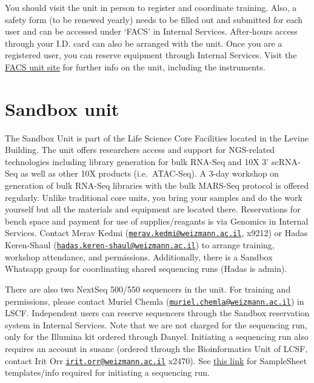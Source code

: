 \documentclass[
]{book}
\begin{document}
You should visit the unit in person to register and coordinate training. Also, a safety form (to be renewed yearly) needs to be filled out and submitted for each user and can be accessed under `FACS' in Internal Services. After-hours access through your I.D. card can also be arranged with the unit. Once you are a registered user, you can reserve equipment through Internal Services. Visit the \href{https://www.weizmann.ac.il/LS_CoreFacilities/flow-cytometry/about}{FACS unit site} for further info on the unit, including the instruments.

\hypertarget{sandbox-unit}{%
\section{Sandbox unit}\label{sandbox-unit}}

The Sandbox Unit is part of the Life Science Core Facilities located in the Levine Building. The unit offers researchers access and support for NGS-related technologies including library generation for bulk RNA-Seq and 10X 3' scRNA-Seq as well as other 10X products (i.e.~ATAC-Seq). A 3-day workshop on generation of bulk RNA-Seq libraries with the bulk MARS-Seq protocol is offered regularly. Unlike traditional core units, you bring your samples and do the work yourself but all the materials and equipment are located there. Reservations for bench space and payment for use of supplies/reagants is via Genomics in Internal Services. Contact Merav Kedmi (\href{mailto:merav.kedmi@weizmann.ac.il}{\nolinkurl{merav.kedmi@weizmann.ac.il}}, x9212) or Hadas Keren-Shaul (\href{mailto:hadas.keren-shaul@weizmann.ac.il}{\nolinkurl{hadas.keren-shaul@weizmann.ac.il}}) to arrange training, workshop attendance, and permissions. Additionally, there is a Sandbox Whatsapp group for coordinating shared sequencing runs (Hadas is admin).

There are also two NextSeq 500/550 sequencers in the unit. For training and permissions, please contact Muriel Chemla (\href{mailto:muriel.chemla@weizmann.ac.il}{\nolinkurl{muriel.chemla@weizmann.ac.il}}) in LSCF. Independent users can reserve sequencers through the Sandbox reservation system in Internal Services. Note that we are not charged for the sequencing run, only for the Illumina kit ordered through Danyel. Initiating a sequencing run also requires an account in susanc (ordered through the Bioinformatics Unit of LCSF, contact Irit Orr \href{mailto:irit.orr@weizmann.ac.il}{\nolinkurl{irit.orr@weizmann.ac.il}} x2470). See \href{https://susanc.weizmann.ac.il/static/doc//howto.html}{this link} for SampleSheet templates/info required for initiating a sequencing run.
\end{document}
